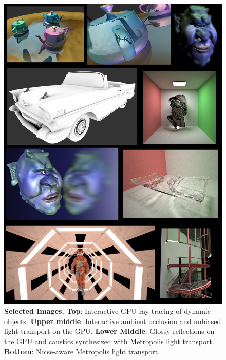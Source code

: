 \documentclass{article}
\begin{document}
\begin{figure}
\centering
\includegraphics[width=6.5in]{images/composite.png}
\caption{\textbf{Selected Images.} \textbf{Top}: Interactive GPU ray tracing of dynamic objects.
        \textbf{Upper middle}: Interactive ambient occlusion and unbiased light transport on the GPU.
        \textbf{Lower Middle}: Glossy reflections on the GPU and caustics synthesized with Metropolis light transport.
        \textbf{Bottom}: Noise-aware Metropolis light transport.}
\end{figure}
\end{document}
